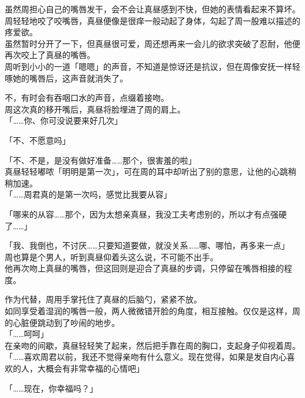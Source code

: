 虽然周担心自己的嘴唇发干，会不会让真昼感到不快，但她的表情看起来不算坏。周轻轻地咬了咬嘴唇，真昼便像是很痒一般动起了身体，勾起了周一股难以描述的疼爱欲。\\

虽然暂时分开了一下，但真昼很可爱，周还想再来一会儿的欲求突破了忍耐，他便再次咬上了真昼的嘴唇。\\

周听到小小的一道「嗯嗯」的声音，不知道是惊讶还是抗议，但在周像安抚一样轻啄她的嘴唇后，这声音就消失了。

不，有时会有吞咽口水的声音，点缀着接吻。\\

周这次真的移开嘴后，真昼将脸埋进了周的肩上。\\

「……你、你可没说要来好几次」

「不、不愿意吗」

「不、不是，是没有做好准备……那个，很害羞的啦」\\

真昼轻轻嘟哝「明明是第一次」，可在周的耳中却听出了别的意思，让他的心跳稍稍加速。\\

「……周君真的是第一次吗，感觉比我要从容」

「哪来的从容……那个，因为太想亲真昼，我没工夫考虑别的，所以才有点强硬了……」

「我、我倒也，不讨厌……只要知道要做，就没关系……哪、哪怕，再多来一点」\\

周也算是个男人，听到真昼仰着头这么说，不可能不出手。\\

他再次吻上真昼的嘴唇，但这回则是迎合了真昼的步调，只停留在嘴唇相接的程度。

作为代替，周用手掌托住了真昼的后脑勺，紧紧不放。\\

如同享受着湿润的嘴唇一般，两人微微错开脸的角度，相互接触。仅仅是这样，周的心脏便跳动到了吵闹的地步。\\

「……呵呵」\\

在亲吻的间歇，真昼轻轻笑了起来，然后把手靠在周的胸口，支起身子仰视着周。\\

「……喜欢周君以前，我还不觉得亲吻有什么意义。现在觉得，如果是发自内心喜欢的人，大概会有非常幸福的心情吧」

「……现在，你幸福吗？」

